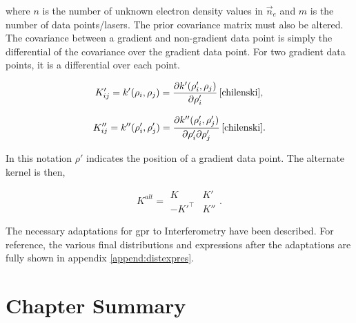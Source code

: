 \noindent where $n$ is the number of unknown electron density values in $\vec n_e$ and $m$ is the number of data points/lasers. The prior covariance matrix must also be altered. The covariance between a gradient and non-gradient data point is simply the differential of the covariance over the gradient data point. For two gradient data points, it is a differential over each point.

\begin{equation}
  K'_{ij} = k'(\rho_i, \rho_j) = \frac{\partial k'(\rho'_i, \rho_j)}{\partial \rho'_i} \, \cite{chilenski},
\end{equation}

\begin{equation}
  K''_{ij} = k''(\rho'_i, \rho'_j) = \frac{\partial k''(\rho'_i, \rho'_j)}{\partial \rho'_i \partial \rho'_j} \, \cite{chilenski}.
\end{equation}

\noindent In this notation $\rho'$ indicates the position of a gradient data point. The alternate kernel is then,

\begin{equation}
  K^{alt} = 
    \begin{matrix}
      K & K'\\
      -K'^{\top} & K''
    \end{matrix}.  
\end{equation}

The necessary adaptations for \gls{gpr} to Interferometry have been described. For reference, the various final distributions and expressions after the adaptations are fully shown in appendix \ref{append:distexpres}.

\section{Chapter Summary}

